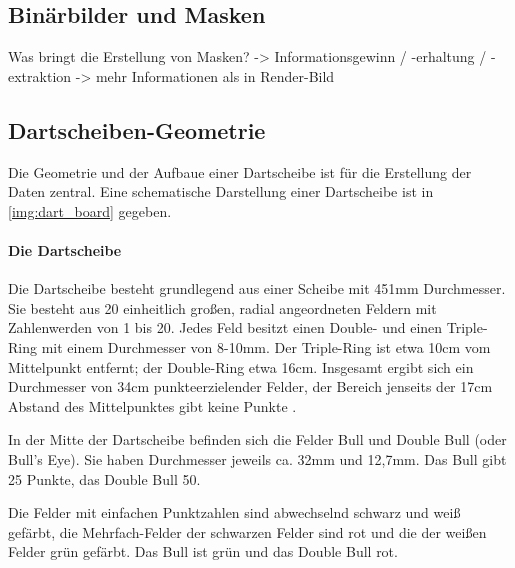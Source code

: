 
\subsection{Binärbilder und Masken}
\label{sec:masken}

Was bringt die Erstellung von Masken? -> Informationsgewinn / -erhaltung / -extraktion -> mehr Informationen als in Render-Bild



\subsection{Dartscheiben-Geometrie}  %
\label{sec:dartscheiben_geometrie}

Die Geometrie und der Aufbaue einer Dartscheibe ist für die Erstellung der Daten zentral. Eine schematische Darstellung einer Dartscheibe ist in \autoref{img:dart_board} gegeben.

\paragraph{Die Dartscheibe}

Die Dartscheibe besteht grundlegend aus einer Scheibe mit 451mm Durchmesser. Sie besteht aus 20 einheitlich großen, radial angeordneten Feldern mit Zahlenwerden von 1 bis 20. Jedes Feld besitzt einen Double- und einen Triple-Ring mit einem Durchmesser von 8-10mm. Der Triple-Ring ist etwa 10cm vom Mittelpunkt entfernt; der Double-Ring etwa 16cm. Insgesamt ergibt sich ein Durchmesser von 34cm punkteerzielender Felder, der Bereich jenseits der 17cm Abstand des Mittelpunktes gibt keine Punkte \cite{wdf-rules}.

In der Mitte der Dartscheibe befinden sich die Felder Bull und Double Bull (oder Bull's Eye). Sie haben Durchmesser jeweils ca. 32mm und 12,7mm. Das Bull gibt 25 Punkte, das Double Bull 50.

Die Felder mit einfachen Punktzahlen sind abwechselnd schwarz und weiß gefärbt, die Mehrfach-Felder der schwarzen Felder sind rot und die der weißen Felder grün gefärbt. Das Bull ist grün und das Double Bull rot.

